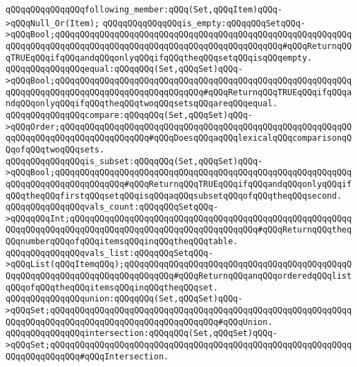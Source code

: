 \verb|qQQqqQQqqQQqqQQqfollowing_member:qQQq(Set,qQQqItem)qQQq->qQQqNull_Or(Item);|\newline
\newline
\verb|qQQqqQQqqQQqqQQqis_empty:qQQqqQQqSetqQQq->qQQqBool;qQQqqQQqqQQqqQQqqQQqqQQqqQQqqQQqqQQqqQQqqQQqqQQqqQQqqQQqqQQqqQQqqQQqqQQqqQQqqQQqqQQqqQQqqQQqqQQqqQQqqQQqqQQqqQQqqQQq#qQQqReturnqQQqTRUEqQQqifqQQqandqQQqonlyqQQqifqQQqtheqQQqsetqQQqisqQQqempty.|\newline
\newline
\verb|qQQqqQQqqQQqqQQqequal:qQQqqQQq(Set,qQQqSet)qQQq->qQQqBool;qQQqqQQqqQQqqQQqqQQqqQQqqQQqqQQqqQQqqQQqqQQqqQQqqQQqqQQqqQQqqQQqqQQqqQQqqQQqqQQqqQQqqQQqqQQqqQQqqQQq#qQQqReturnqQQqTRUEqQQqifqQQqandqQQqonlyqQQqifqQQqtheqQQqtwoqQQqsetsqQQqareqQQqequal.|\newline
\newline
\verb|qQQqqQQqqQQqqQQqcompare:qQQqqQQq(Set,qQQqSet)qQQq->qQQqOrder;qQQqqQQqqQQqqQQqqQQqqQQqqQQqqQQqqQQqqQQqqQQqqQQqqQQqqQQqqQQqqQQqqQQqqQQqqQQqqQQqqQQqqQQq#qQQqDoesqQQqaqQQqlexicalqQQqcomparisonqQQqofqQQqtwoqQQqsets.|\newline
\newline
\verb|qQQqqQQqqQQqqQQqis_subset:qQQqqQQq(Set,qQQqSet)qQQq->qQQqBool;qQQqqQQqqQQqqQQqqQQqqQQqqQQqqQQqqQQqqQQqqQQqqQQqqQQqqQQqqQQqqQQqqQQqqQQqqQQqqQQqqQQq#qQQqReturnqQQqTRUEqQQqifqQQqandqQQqonlyqQQqifqQQqtheqQQqfirstqQQqsetqQQqisqQQqaqQQqsubsetqQQqofqQQqtheqQQqsecond.|\newline
\newline
\verb|qQQqqQQqqQQqqQQqvals_count:qQQqqQQqSetqQQq->qQQqqQQqInt;qQQqqQQqqQQqqQQqqQQqqQQqqQQqqQQqqQQqqQQqqQQqqQQqqQQqqQQqqQQqqQQqqQQqqQQqqQQqqQQqqQQqqQQqqQQqqQQqqQQqqQQqqQQq#qQQqReturnqQQqtheqQQqnumberqQQqofqQQqitemsqQQqinqQQqtheqQQqtable.|\newline
\newline
\verb|qQQqqQQqqQQqqQQqvals_list:qQQqqQQqSetqQQq->qQQqList(qQQqItemqQQq);qQQqqQQqqQQqqQQqqQQqqQQqqQQqqQQqqQQqqQQqqQQqqQQqqQQqqQQqqQQqqQQqqQQqqQQqqQQqqQQq#qQQqReturnqQQqanqQQqorderedqQQqlistqQQqofqQQqtheqQQqitemsqQQqinqQQqtheqQQqset.|\newline
\newline
\verb|qQQqqQQqqQQqqQQqunion:qQQqqQQq(Set,qQQqSet)qQQq->qQQqSet;qQQqqQQqqQQqqQQqqQQqqQQqqQQqqQQqqQQqqQQqqQQqqQQqqQQqqQQqqQQqqQQqqQQqqQQqqQQqqQQqqQQqqQQqqQQqqQQqqQQqqQQq#qQQqUnion.|\newline
\newline
\verb|qQQqqQQqqQQqqQQqintersection:qQQqqQQq(Set,qQQqSet)qQQq->qQQqSet;qQQqqQQqqQQqqQQqqQQqqQQqqQQqqQQqqQQqqQQqqQQqqQQqqQQqqQQqqQQqqQQqqQQqqQQqqQQq#qQQqIntersection.|\newline

